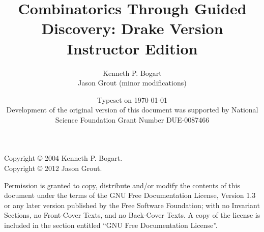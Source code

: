 \documentclass[12 pt]{book}
\title{Combinatorics Through Guided
  Discovery: Drake Version
\ifinstructor
\\\bigskip
Instructor Edition
\fi}
\author{Kenneth P. Bogart \\
  Jason Grout (minor modifications)}
\date{Typeset on \today\\
  \vfill \normalsize Development of the original version of this document was
  supported by National Science Foundation Grant Number DUE-0087466}
\begin{document}
\frontmatter
\maketitle
\vspace*{\fill}
\noindent Copyright  \copyright{} 2004 Kenneth P. Bogart.  \\
Copyright  \copyright{} 2012 Jason Grout.

\noindent Permission is granted to copy, distribute and/or modify the contents
of this document under the terms of the GNU Free Documentation License,
Version 1.3 or any later version published by the Free Software
Foundation; with no Invariant Sections, no Front-Cover Texts, and no
Back-Cover Texts.  A copy of the license is included in the section
entitled ``GNU Free Documentation License''.

\tableofcontents

%


\mainmatter




 







\backmatter
\printindex
\end{document}
